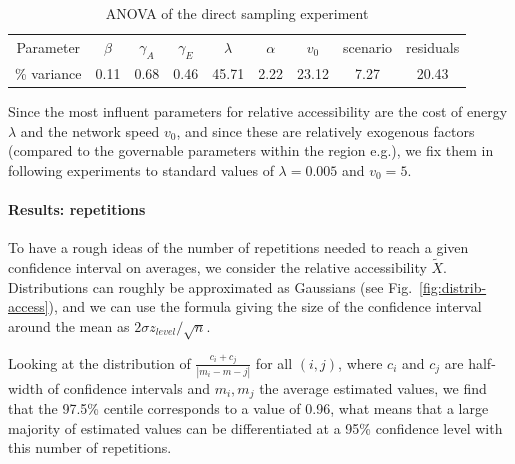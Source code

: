 
\begin{table}
\caption{ANOVA of the direct sampling experiment}
\begin{center}
\begin{tabular}{|c|c|c|c|c|c|c|c|c|}
\hline
Parameter & $\beta$ & $\gamma_A$ & $\gamma_E$ & $\lambda$ & $\alpha$ & $v_0$ & scenario & residuals \\
\% variance & 0.11 & 0.68 & 0.46 & 45.71 & 2.22 & 23.12 & 7.27 & 20.43 \\
\hline
\end{tabular}
\end{center}
\end{table}

Since the most influent parameters for relative accessibility are the cost of energy $\lambda$ and the network speed $v_0$, and since these are relatively exogenous factors (compared to the governable parameters within the region e.g.), we fix them in following experiments to standard values of $\lambda = 0.005$ and $v_0 = 5$.


\paragraph{Results: repetitions}

To have a rough ideas of the number of repetitions needed to reach a given confidence interval on averages, we consider the relative accessibility $\tilde{X}$. Distributions can roughly be approximated as Gaussians (see Fig.~\ref{fig:distrib-access}), and we can use the formula giving the size of the confidence interval around the mean as $2\sigma z_{level} / \sqrt{n}$.

Looking at the distribution of $\frac{c_i + c_j}{\left|m_i - m-j\right|}$ for all $(i,j)$, where $c_i$ and $c_j$ are half-width of confidence intervals and $m_i,m_j$ the average estimated values, we find that the 97.5\% centile corresponds to a value of 0.96, what means that a large majority of estimated values can be differentiated at a 95\% confidence level with this number of repetitions.



